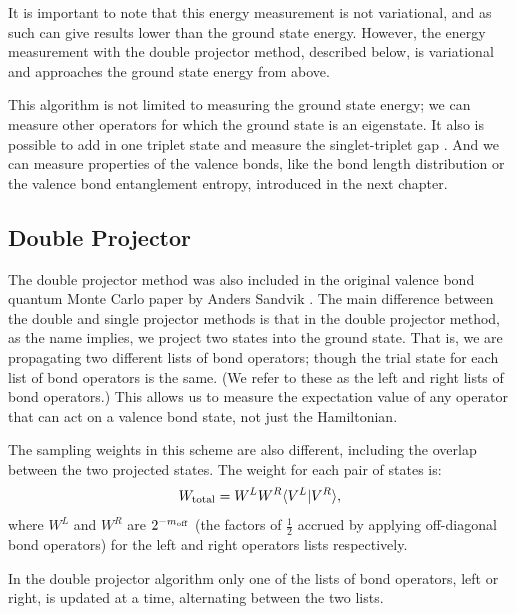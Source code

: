 It is important to note that this energy measurement is not variational, and as such can give results lower than the ground state energy. However, the energy measurement with the double projector method, described below, is variational and approaches the ground state energy from above.

This algorithm is not limited to measuring the ground state energy; we can measure other operators for which the ground state is an eigenstate.
It also is possible to add in one triplet state and measure the singlet-triplet gap \cite{Sandvik_vbqmc}.
And we can measure properties of the valence bonds, like the bond length distribution or the valence bond entanglement entropy, introduced in the next chapter.\\

\subsection{Double Projector}
\label{sec:dubproj}
The double projector method was also included in the original valence bond quantum Monte Carlo paper by Anders Sandvik \cite{Sandvik_vbqmc}.
The main difference between the double and single projector methods is that in the double projector method, as the name implies, we project two states into the ground state.  
That is, we are propagating two different lists of bond operators;
though the trial state for each list of bond operators is the same.
(We refer to these as the left and right lists of bond operators.)
This allows us to measure the expectation value of any operator that can act on a valence bond state, not just the Hamiltonian.

The sampling weights in this scheme are also different, including the overlap between the two projected states.  The weight for each pair of states is:
\begin{equation} \label{supaweight}
W_{\rm total} = W^LW^R\langle {V^L} \rvert V^R\rangle,
\end{equation}
where $W^L$ and $W^R$ are $2^{-m_{\rm off}}$ (the factors of $\frac{1}{2}$ accrued by applying off-diagonal bond operators) for the left and right operators lists respectively.  

In the double projector algorithm only one of the lists of bond operators, left or right, is updated at a time, alternating between the two lists.

